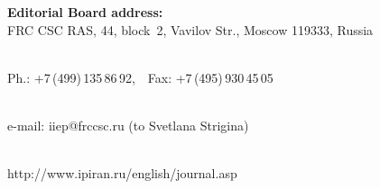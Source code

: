 {\vspace*{-1mm}








\begin{center}


\textbf{Editorial Board address:} \\
















FRC CSC RAS, 44, block~2, Vavilov Str., Moscow 119333, Russia\\[-10pt]





\





Ph.: +7\,(499)\,135\,86\,92,\ \ Fax: +7\,(495)\,930\,45\,05\\[-10pt]





\





 e-mail: {\sf iiep@frccsc.ru} (to Svetlana Strigina)\\[-10pt]





\





 {\sf http://www.ipiran.ru/english/journal.asp}


\end{center}


 }







\def\leftkol{Requirements for manuscripts submitted to Journal


``Informatics~and~Applications''}





\def\rightkol{Requirements for manuscripts submitted to Journal


``Informatics~and~Applications''}





